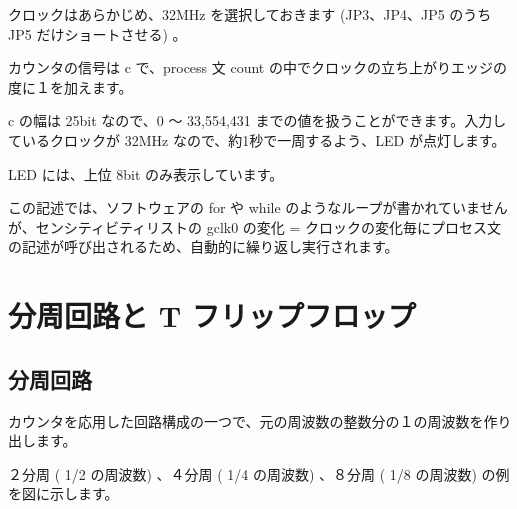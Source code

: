 \documentclass[letterpaper,10pt,dvipdfmx]{sphinxmanual}
\begin{document}
\begin{sphinxVerbatim}[commandchars=\\\{\}]
      
      
      
      
      
      
      
      
 
\end{sphinxVerbatim}

クロックはあらかじめ、32MHz を選択しておきます (JP3、JP4、JP5 のうち JP5 だけショートさせる) 。

カウンタの信号は c で、process 文 count の中でクロックの立ち上がりエッジの度に１を加えます。

c の幅は 25bit なので、0 ～ 33,554,431 までの値を扱うことができます。入力しているクロックが 32MHz なので、約1秒で一周するよう、LED が点灯します。

LED には、上位 8bit のみ表示しています。

この記述では、ソフトウェアの for や while のようなループが書かれていませんが、センシティビティリストの gclk0 の変化 = クロックの変化毎にプロセス文の記述が呼び出されるため、自動的に繰り返し実行されます。


\section{分周回路と T フリップフロップ}
\label{\detokenize{05_try:t}}

\subsection{分周回路}
\label{\detokenize{05_try:id16}}
カウンタを応用した回路構成の一つで、元の周波数の整数分の１の周波数を作り出します。

２分周 ( 1/2 の周波数) 、４分周 ( 1/4 の周波数) 、８分周 ( 1/8 の周波数) の例を図に示します。

\begin{figure}[htbp]
\centering

\noindent{}
\end{figure}
\end{document}
